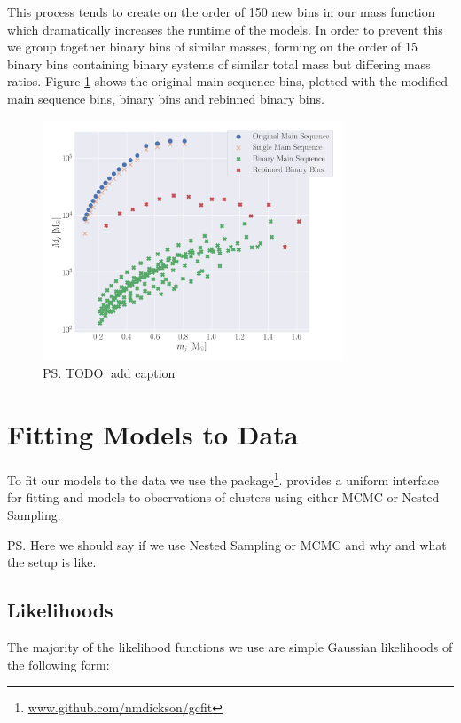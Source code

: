 This process tends to create on the order of 150 new bins in our mass function which dramatically
increases the runtime of the  models. In order to prevent this we group together binary
bins of similar masses, forming on the order of 15 binary bins containing binary systems of similar
total mass but differing mass ratios. Figure \ref{fig:2/shifted-mf} shows the original main sequence
bins, plotted with the modified main sequence bins, binary bins and rebinned binary bins.


\begin{figure}
	\centering
	\includegraphics[width=0.8\textwidth]{figures/shifted-mf.png}
	\caption{\ps{TODO: add caption}}
	\label{fig:2/shifted-mf}
\end{figure}



\section{Fitting Models to Data}


To fit our models to the data we use the 
package\footnote{\url{www.github.com/nmdickson/gcfit}}.  provides a uniform interface
for fitting \evolvemf{} and  models to observations of clusters using either MCMC or
Nested Sampling.

\ps{Here we should say if we use Nested Sampling or MCMC and why  and what the setup is like.}

\subsection{Likelihoods}

The majority of the likelihood functions we use are simple Gaussian likelihoods of the following form:

